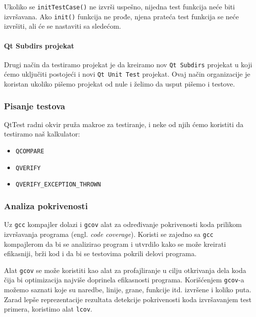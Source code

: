 Ukoliko se \texttt{initTestCase()} ne izvrši uspešno, nijedna test funkcija neće biti izvršavana. Ako \texttt{init()} funkcija ne prođe, njena prateća test funkcija se neće izvršiti, ali će se nastaviti sa sledećom.

\paragraph{Qt Subdirs projekat}\label{qt-subdirs-projekat}

Drugi način da testiramo projekat je da kreiramo nov \texttt{Qt\ Subdirs} projekat u koji ćemo uključiti postojeći i novi \texttt{Qt\ Unit\ Test} projekat. Ovaj način organizacije je koristan ukoliko pišemo projekat od nule i želimo da usput pišemo i testove.

\subsubsection{Pisanje testova}\label{pisanje-testova}

QtTest radni okvir pruža makroe za testiranje, i neke od njih ćemo koristiti da testiramo naš kalkulator:

\begin{itemize}
\tightlist
\item
  \texttt{QCOMPARE}
\item
  \texttt{QVERIFY}
\item
  \texttt{QVERIFY\_EXCEPTION\_THROWN}
\end{itemize}

\subsubsection{Analiza pokrivenosti}\label{analiza-pokrivenosti}

Uz \texttt{gcc} kompajler dolazi i \texttt{gcov} alat za određivanje pokrivenosti koda prilikom izvršavanja programa (engl. \emph{code coverage}). Koristi se zajedno sa \texttt{gcc} kompajlerom da bi se analizirao program i utvrdilo kako se može kreirati efikasniji, brži kod i da bi se testovima pokrili delovi programa.

Alat \texttt{gcov} se može koristiti kao alat za profajliranje u cilju otkrivanja dela koda čija bi optimizacija najviše doprinela efikasnosti programa. Korišćenjem \texttt{gcov}-a možemo saznati koje su naredbe, linije, grane, funkcije itd. izvršene i koliko puta. Zarad lepše reprezentacije rezultata detekcije pokrivenosti koda izvršavanjem test primera, koristimo alat \texttt{lcov}.


